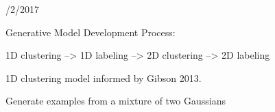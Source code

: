 \documentclass[12pt]{article}
\begin{document}
\newpage

/2/2017

\vspace{.2in}

\noindent Generative Model Development Process:

1D clustering --> 1D labeling --> 2D clustering --> 2D labeling

\vspace{.2in}

1D clustering model informed by Gibson 2013.

Generate examples from a mixture of two Gaussians 
\end{document}
